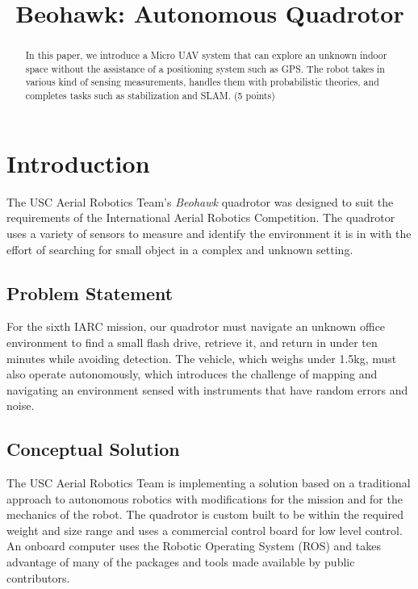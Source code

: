 \documentclass[12pt, letterpaper]{article}
\title{Beohawk: Autonomous Quadrotor}
\begin{document}
\maketitle
\begin{people}
\end{people}

\begin{abstract}
	In this paper, we introduce a Micro UAV system that can explore an unknown indoor space without the assistance of a positioning system such as GPS. The robot takes in various kind of sensing measurements, handles them with probabilistic theories, and completes tasks such as stabilization and SLAM.  (5 points)
\end{abstract}

\section{Introduction}
The USC Aerial Robotics Team's \textit{Beohawk} quadrotor was designed to suit the requirements of the International Aerial Robotics Competition. The quadrotor uses a variety of sensors to measure and identify the environment it is in with the effort of searching for small object in a complex and unknown setting.

\subsection{Problem Statement}
For the sixth IARC mission, our quadrotor must navigate an unknown office environment to find a small flash drive, retrieve it, and return in under ten minutes while avoiding detection.  The vehicle, which weighs under 1.5kg, must also operate autonomously, which introduces the challenge of mapping and navigating an environment sensed with instruments that have random errors and noise. 

\subsection{Conceptual Solution}
The USC Aerial Robotics Team is implementing a solution based on a traditional approach to autonomous robotics with modifications for the mission and for the mechanics of the robot. The quadrotor is custom built to be within the required weight and size range and uses a commercial control board for low level control. An onboard computer uses the Robotic Operating System (ROS) and takes advantage of many of the packages and tools made available by public contributors. 
\end{document}
